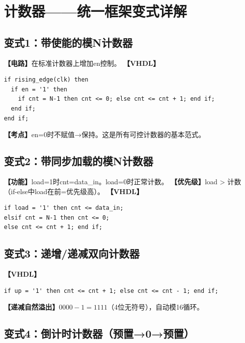 \chapter{计数器——统一框架变式详解}

\section{变式1：带使能的模N计数器}

\begin{detailbox}[完整教学]
\textbf{【电路】}在标准计数器上增加en控制。
\textbf{【VHDL】}
\begin{lstlisting}
if rising_edge(clk) then
  if en = '1' then
    if cnt = N-1 then cnt <= 0; else cnt <= cnt + 1; end if;
  end if;
end if;
\end{lstlisting}
\textbf{【考点】}en=0时不赋值→保持。这是所有可控计数器的基本范式。
\end{detailbox}


\section{变式2：带同步加载的模N计数器}

\begin{detailbox}[完整教学]
\textbf{【功能】}load=1时cnt=data\_in。load=0时正常计数。
\textbf{【优先级】}load > 计数（if-else中load在前=优先级高）。
\textbf{【VHDL】}
\begin{lstlisting}
if load = '1' then cnt <= data_in;
elsif cnt = N-1 then cnt <= 0;
else cnt <= cnt + 1; end if;
\end{lstlisting}
\end{detailbox}


\section{变式3：递增/递减双向计数器}

\begin{detailbox}[完整教学]
\textbf{【VHDL】}
\begin{lstlisting}
if up = '1' then cnt <= cnt + 1; else cnt <= cnt - 1; end if;
\end{lstlisting}
\textbf{【递减自然溢出】}$0000-1=1111$（4位无符号），自动模16循环。
\end{detailbox}


\section{变式4：倒计时计数器（预置→0→预置）}

